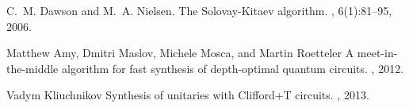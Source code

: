 \begin{thebibliography}{9}

C.~M. Dawson and M.~A. Nielsen.
\newblock The {S}olovay-{K}itaev algorithm.
, 6(1):81--95, 2006.

Matthew Amy, Dmitri Maslov, Michele Mosca, and Martin Roetteler
\newblock A meet-in-the-middle algorithm for fast synthesis of depth-optimal quantum circuits.
, 2012.

Vadym Kliuchnikov
\newblock Synthesis of unitaries with Clifford+T circuits.
, 2013.

\end{thebibliography}
